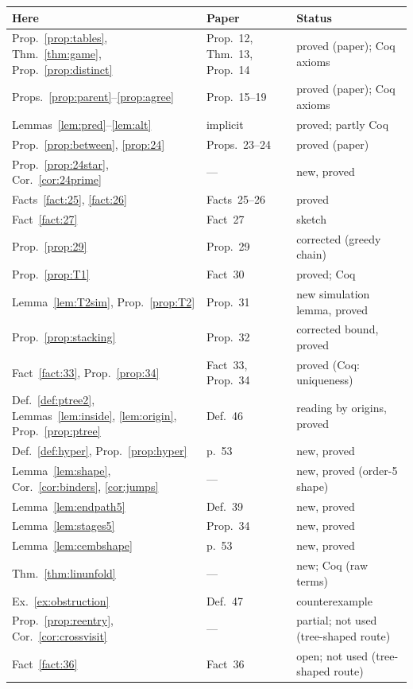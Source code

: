 \documentclass[11pt]{article}
\theoremstyle{plain}
\theoremstyle{definition}
\theoremstyle{remark}
\begin{document}
\begin{center}
\small
\begin{tabular}{lll}
Here & Paper & Status\\\hline
Prop.~\ref{prop:tables}, Thm.~\ref{thm:game}, Prop.~\ref{prop:distinct} & Prop.~12, Thm.~13, Prop.~14 & proved (paper); Coq axioms\\
Props.~\ref{prop:parent}--\ref{prop:agree} & Prop.~15--19 & proved (paper); Coq axioms\\
Lemmas~\ref{lem:pred}--\ref{lem:alt} & implicit & proved; partly Coq\\
Prop.~\ref{prop:between}, \ref{prop:24} & Props.~23--24 & proved (paper)\\
Prop.~\ref{prop:24star}, Cor.~\ref{cor:24prime} & --- & new, proved\\
Facts~\ref{fact:25}, \ref{fact:26} & Facts~25--26 & proved\\
Fact~\ref{fact:27} & Fact~27 & sketch\\
Prop.~\ref{prop:29} & Prop.~29 & corrected (greedy chain)\\
Prop.~\ref{prop:T1} & Fact~30 & proved; Coq\\
Lemma~\ref{lem:T2sim}, Prop.~\ref{prop:T2} & Prop.~31 & new simulation lemma, proved\\
Prop.~\ref{prop:stacking} & Prop.~32 & corrected bound, proved\\
Fact~\ref{fact:33}, Prop.~\ref{prop:34} & Fact~33, Prop.~34 & proved (Coq: uniqueness)\\
Def.~\ref{def:ptree2}, Lemmas~\ref{lem:inside}, \ref{lem:origin}, Prop.~\ref{prop:ptree} & Def.~46 & reading by origins, proved\\
Def.~\ref{def:hyper}, Prop.~\ref{prop:hyper} & p.~53 & new, proved\\
Lemma~\ref{lem:shape}, Cor.~\ref{cor:binders}, \ref{cor:jumps} & --- & new, proved (order-5 shape)\\
Lemma~\ref{lem:endpath5} & Def.~39 & new, proved\\
Lemma~\ref{lem:stages5} & Prop.~34 & new, proved\\
Lemma~\ref{lem:cembshape} & p.~53 & new, proved\\
Thm.~\ref{thm:linunfold} & --- & new; Coq (raw terms)\\
Ex.~\ref{ex:obstruction} & Def.~47 & counterexample\\
Prop.~\ref{prop:reentry}, Cor.~\ref{cor:crossvisit} & --- & partial; not used (tree-shaped route)\\
Fact~\ref{fact:36} & Fact~36 & open; not used (tree-shaped route)\\

\end{tabular}
\end{center}
\end{document}
